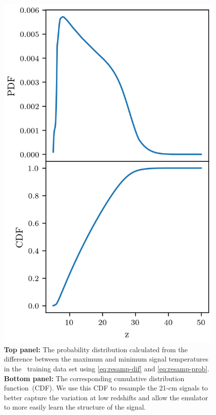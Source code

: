 \begin{figure}
    \centering
    \includegraphics{globalemu/figs/cdf_and_pdf.png}
    \caption{\textbf{Top panel:} The probability distribution calculated from the difference between the maximum and minimum signal temperatures in the \cmGEM~training data set using \cref{eq:resamp-dif} and \cref{eq:resamp-prob}. \textbf{Bottom panel:} The corresponding cumulative distribution function~(CDF). We use this CDF to resample the 21-cm signals
    to better capture the variation at low redshifts and allow the emulator to more easily learn the structure of the signal.}
    \label{fig:PDF_CDF}
\end{figure}

